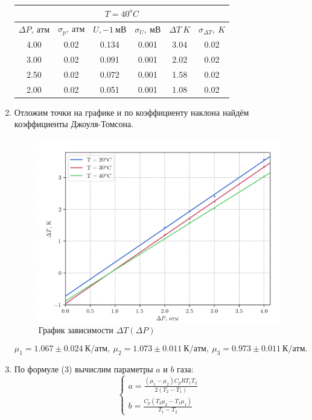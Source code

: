 \documentclass[12pt,a4paper]{article}
\begin{document}
\begin{enumerate}
    \begin{table}[htp]
        \centering
        \begin{tabular}[htp]{|c|c|c|c|c|c|}
            \hline
            \multicolumn{6}{|c|}{$T=40^oC$}\\
            \hline
            $\Delta P,\ атм$&$\sigma_p,\ атм$&$U,-1\ мВ$&$\sigma_U,\ мВ$&$\Delta T\ K$&$\sigma_{\Delta T},\ K$\\
            \hline
            4.00&0.02&0.134&0.001&3.04&0.02\\
            \hline
            3.00&0.02&0.091&0.001&2.02&0.02\\
            \hline
            2.50&0.02&0.072&0.001&1.58&0.02\\
            \hline
            2.00&0.02&0.051&0.001&1.08&0.02\\
            \hline
        \end{tabular}
    \end{table}
\newpage
    \item Отложим точки на графике и по коэффициенту наклона найдём коэффициенты Джоуля-Томсона.
    \begin{figure}[htp]
        \centering
        \includegraphics[scale=0.73]{TP2.png}
        \caption{График зависимости $\Delta T (\Delta P)$}
    \end{figure}
    \begin{equation*}
        \mu_1 = 1.067 \pm 0.024\ К/атм,\ \mu_2 = 1.073 \pm 0.011\ К/атм,\ \mu_3 = 0.973 \pm 0.011\ К/атм. 
    \end{equation*}
    \item По формуле (3) вычислим параметры $a$ и $b$ газа:
    \begin{equation*}
        \begin{cases}
            \displaystyle a = \frac{(\mu_1 - \mu_2)C_pRT_1T_2}{2(T_2-T_1)}\\
            \displaystyle b = \frac{C_p(T_2\mu_2 - T_1\mu_1)}{T_1-T_2}   
        \end{cases}
    \end{equation*}


\end{enumerate}
\end{document}
